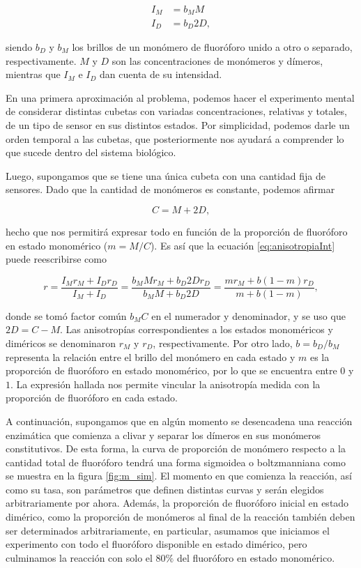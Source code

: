 \begin{align}
    I_M &= b_M M\\
    I_D &= b_D 2D,
\end{align}

\noindent siendo $b_D$ y $b_M$ los brillos de un monómero de fluoróforo unido a otro o separado, respectivamente. $M$ y $D$ son las concentraciones de monómeros y dímeros, mientras que $I_M$ e $I_D$ dan cuenta de su intensidad.

En una primera aproximación al problema, podemos hacer el experimento mental de considerar distintas cubetas con variadas concentraciones, relativas y totales, de un tipo de sensor en sus distintos estados. Por simplicidad, podemos darle un orden temporal a las cubetas, que posteriormente nos ayudará a comprender lo que sucede dentro del sistema biológico.

Luego, supongamos que se tiene una única cubeta con una cantidad fija de sensores. Dado que la cantidad de monómeros es constante, podemos afirmar

\begin{equation}
    C = M + 2D,
    \label{eq:C_cte}
\end{equation}

\noindent hecho que nos permitirá expresar todo en función de la proporción de fluoróforo en estado monomérico ($m=M/C$). Es así que la ecuación \ref{eq:anisotropiaInt} puede reescribirse como

\begin{equation}
    r = \frac{I_M r_M + I_D r_D}{I_M+I_D} = \frac{b_M M r_M + b_D 2D r_D}{b_M M+b_D 2D} = \frac{m r_M + b (1-m) r_D}{m+b (1-m)},
    \label{eq:AnisotropiaFromParams}
\end{equation}

\noindent donde se tomó factor común $b_M C$ en el numerador y denominador, y se uso que $2D = C - M$. Las anisotropías correspondientes a los estados monoméricos y diméricos se denominaron $r_M$ y $r_D$, respectivamente. Por otro lado, $b = b_D/b_M$ representa la relación entre el brillo del monómero en cada estado y $m$ es la proporción de fluoróforo en estado monomérico, por lo que se encuentra entre $0$ y $1$. La expresión hallada nos permite vincular la anisotropía medida con la proporción de fluoróforo en cada estado.

A continuación, supongamos que en algún momento se desencadena una reacción enzimática que comienza a clivar y separar los dímeros en sus monómeros constitutivos. De esta forma, la curva de proporción de monómero respecto a la cantidad total de fluoróforo tendrá una forma sigmoidea o boltzmanniana como se muestra en la figura \ref{fig:m_sim}. El momento en que comienza la reacción, así como su tasa, son parámetros que definen distintas curvas y serán elegidos arbitrariamente por ahora. Además, la proporción de fluoróforo inicial en estado dimérico, como la proporción de monómeros al final de la reacción también deben ser determinados arbitrariamente, en particular, asumamos que iniciamos el experimento con todo el fluoróforo disponible en estado dimérico, pero culminamos la reacción con solo el 80$\%$ del fluoróforo en estado monomérico.

